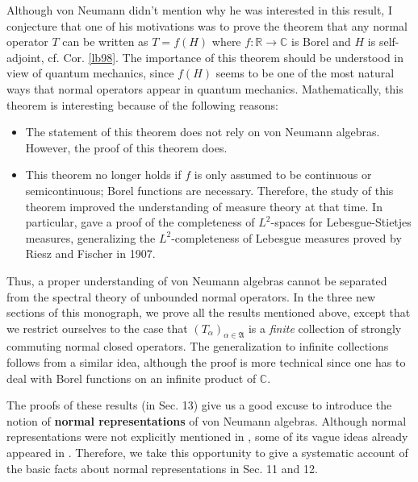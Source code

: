 \documentclass[12pt,b5paper,notitlepage]{article}
\theoremstyle{definition}
\theoremstyle{plain}
\newcommand{\fk}{\mathfrak}
\newcommand{\Cbb}{\mathbb C}
\newcommand{\Rbb}{\mathbb R}
\numberwithin{equation}{section}
\begin{document}
Although von Neumann didn't mention why he was interested in this result, I conjecture that one of his motivations was to prove the theorem that any normal operator $T$ can be written as $T=f(H)$ where $f:\Rbb\rightarrow\Cbb$ is Borel and $H$ is self-adjoint, cf. Cor. \ref{lb98}. The importance of this theorem should be understood in view of quantum mechanics, since $f(H)$ seems to be one of the most natural ways that normal operators appear in quantum mechanics. Mathematically, this theorem is interesting because of the following reasons:
\begin{itemize}
\item The statement of this theorem does not rely on von Neumann algebras. However, the proof of this theorem does.
\item This theorem no longer holds if $f$ is only assumed to be  continuous or semicontinuous; Borel functions are necessary. Therefore, the study of this theorem improved the understanding of measure theory at that time. In particular, \cite{vNeu31} gave a proof of the completeness of $L^2$-spaces for Lebesgue-Stietjes measures, generalizing the $L^2$-completeness of Lebesgue measures proved by Riesz and Fischer in 1907.
\end{itemize}



Thus, a proper understanding of von Neumann algebras cannot be separated from the spectral theory of unbounded normal operators. In the three new sections of this monograph, we prove all the results mentioned above, except that we restrict ourselves to the case that $(T_\alpha)_{\alpha\in\fk A}$ is a \textit{finite} collection of strongly commuting normal closed operators. The generalization to infinite collections follows from a similar idea, although the proof is more technical since one has to deal with Borel functions on an infinite product of $\Cbb$.



The proofs of these results (in Sec. 13) give us a good excuse to introduce the notion of \textbf{normal representations} of von Neumann algebras. Although normal representations were not explicitly mentioned in \cite{vNeu29,vNeu31}, some of its vague ideas already appeared in \cite{vNeu31}. Therefore, we take this opportunity to give a systematic account of the basic facts about normal representations in Sec. 11 and 12.
\end{document}
